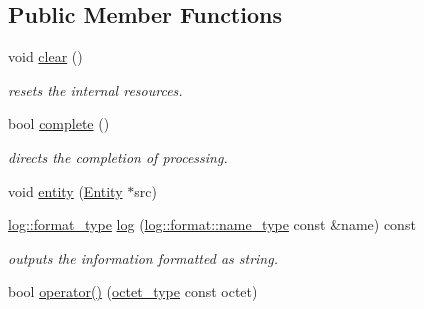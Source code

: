 \subsection*{Public Member Functions}
\begin{DoxyCompactItemize}
\item 
\hypertarget{classhryky_1_1uri_1_1authority_1_1_reader_a33a9e6658fb3259ae03b6b4ad57f526c}{void \hyperlink{classhryky_1_1uri_1_1authority_1_1_reader_a33a9e6658fb3259ae03b6b4ad57f526c}{clear} ()}\label{classhryky_1_1uri_1_1authority_1_1_reader_a33a9e6658fb3259ae03b6b4ad57f526c}

\begin{DoxyCompactList}\small\item\em resets the internal resources. \end{DoxyCompactList}\item 
\hypertarget{classhryky_1_1uri_1_1authority_1_1_reader_a0cc65766f8a73acade9e6dbb0c956c19}{bool \hyperlink{classhryky_1_1uri_1_1authority_1_1_reader_a0cc65766f8a73acade9e6dbb0c956c19}{complete} ()}\label{classhryky_1_1uri_1_1authority_1_1_reader_a0cc65766f8a73acade9e6dbb0c956c19}

\begin{DoxyCompactList}\small\item\em directs the completion of processing. \end{DoxyCompactList}\item 
void \hyperlink{classhryky_1_1uri_1_1authority_1_1_reader_ab6e6734c80f46e945a5ae44fa3346bab}{entity} (\hyperlink{classhryky_1_1uri_1_1authority_1_1_entity}{Entity} $\ast$src)
\item 
\hypertarget{classhryky_1_1uri_1_1authority_1_1_reader_ab0bfb1dc324ccf194b51c197ef885c9d}{\hyperlink{namespacehryky_1_1log_ad50448c3f934f1eacd5c1bcffe8111e1}{log\-::format\-\_\-type} \hyperlink{classhryky_1_1uri_1_1authority_1_1_reader_ab0bfb1dc324ccf194b51c197ef885c9d}{log} (\hyperlink{namespacehryky_1_1log_1_1format_ab7408d1e2ed2d648dbf9bba69eb74288}{log\-::format\-::name\-\_\-type} const \&name) const }\label{classhryky_1_1uri_1_1authority_1_1_reader_ab0bfb1dc324ccf194b51c197ef885c9d}

\begin{DoxyCompactList}\small\item\em outputs the information formatted as string. \end{DoxyCompactList}\item 
\hypertarget{classhryky_1_1uri_1_1authority_1_1_reader_a6b63c152007da2987e351b509fd2b992}{bool \hyperlink{classhryky_1_1uri_1_1authority_1_1_reader_a6b63c152007da2987e351b509fd2b992}{operator()} (\hyperlink{namespacehryky_a488cba8b666be33ccca70e819684e3c8}{octet\-\_\-type} const octet)}\label{classhryky_1_1uri_1_1authority_1_1_reader_a6b63c152007da2987e351b509fd2b992}


\end{DoxyCompactItemize}
